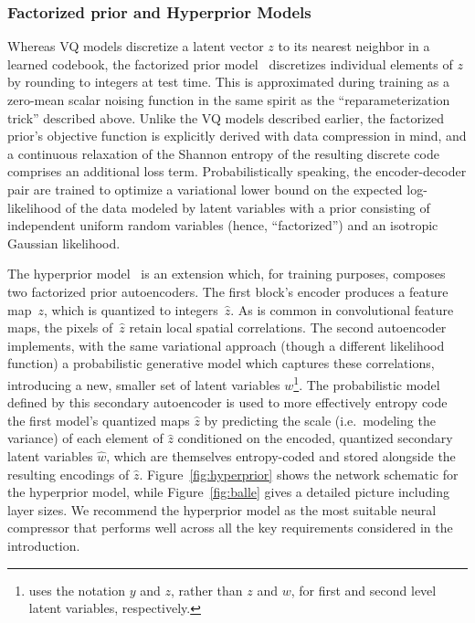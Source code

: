 \subsubsection{Factorized prior and Hyperprior Models}

Whereas VQ models discretize a latent vector $z$ to its nearest neighbor in a learned codebook, the factorized prior model~\citep{balle2017fp} discretizes individual elements of $z$ by rounding to integers at test time.
This is approximated during training as a zero-mean scalar noising function in the same spirit as the ``reparameterization trick'' described above.
Unlike the VQ models described earlier, the factorized prior's objective function is explicitly derived with data compression in mind, and a continuous relaxation of the Shannon entropy of the resulting discrete code comprises an additional loss term.
Probabilistically speaking, the encoder-decoder pair are trained to optimize a variational lower bound on the expected log-likelihood of the data modeled by latent variables with a prior consisting of independent uniform random variables (hence, ``factorized'') and an isotropic Gaussian likelihood.

The hyperprior model~\citep{balle2018hp} is an extension which, for training purposes, composes two factorized prior autoencoders.
The first block's encoder produces a feature map~$z$, which is quantized to integers~$\hat z$.
As is common in convolutional feature maps, the pixels of~$\hat{z}$ retain local spatial correlations.
The second autoencoder implements, with the same variational approach (though a different likelihood function) a probabilistic generative model which captures these correlations, introducing a new, smaller set of latent variables $w$\footnote{\citet{balle2018hp} uses the notation $y$ and $z$, rather than $z$ and $w$, for first and second level latent variables, respectively.}.
The probabilistic model defined by this secondary autoencoder is used to more effectively entropy code the first model's quantized maps $\hat{z}$ by predicting the scale (i.e.\ modeling the variance) of each element of $\hat{z}$ conditioned on the encoded, quantized secondary latent variables $\hat{w}$, which are themselves entropy-coded and stored alongside the  resulting encodings of $\hat{z}$.
Figure~\ref{fig:hyperprior} shows the network schematic for the hyperprior model, while Figure~\ref{fig:balle} gives a detailed picture including layer sizes.
We recommend the hyperprior model as the most suitable neural compressor that performs well across all the key requirements considered in the introduction.

